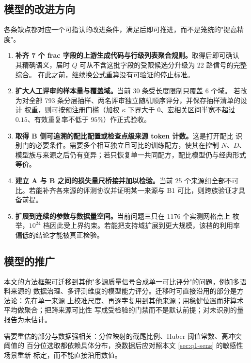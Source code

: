 \documentclass[bwprint]{gmcmthesis}
\numberwithin{equation}{section}
\numberwithin{figure}{section}
\numberwithin{table}{section}
\begin{document}
\subsection{模型的改进方向}

各条缺点都对应一个可指认的改进条件，满足后即可推进，而不是笼统的"提高精度"。

\begin{enumerate}
\item \textbf{补齐 7 个 frac 字段的上游生成代码与行级列表聚合规则。}取得后即可确认
      其精确语义，届时 $Q$ 可从不含这批字段的受限候选分升级为 22 路信号的完整综合。
      在此之前，继续换公式重算没有可验证的停止标准。
\item \textbf{扩大人工评审的样本量与覆盖域。}当前 30 条受长度限制只覆盖 6 个域。
      若改为对全部 793 条分层抽样、两名评审独立随机顺序评分，并保存抽样清单的设计
      权重，则可按预注册门槛（加权 $\kappa$ 下界大于 0、宏相关区间半宽不超过
      $0.15$、有效重复率不低于 $95\%$）作正式验收。
\item \textbf{取得 B 侧可追溯的配比配置或检查点级来源 token 计数。}这是打开配比
      识别门的必要条件。需要多个相互独立且可比的训练配方，使其在控制 $N$、$D$、
      模型族与来源之后仍有变异；若只恢复单一共同配方，配比模型仍与经典形式等价。
\item \textbf{建立 A 与 B 之间的损失量尺桥接并加以检验。}当前 25 个来源组全部不可
      比。若能补齐各来源的评测协议并证明某一来源与 B1 可比，则跨族验证才具备前提。
\item \textbf{扩展到连续的参数与数据量空间。}当前问题三只在 1176 个实测网格点上
      枚举，$10^{24}$ 档因此受上界约束。若能把支持域扩展到更大规模，该档的利用率
      偏低的结论才能被真正检验。
\end{enumerate}

\subsection{模型的推广}

本文的方法框架可迁移到其他"多源质量信号合成单一可比评分"的问题，例如多语料来源的
数据治理、多评测维度的模型能力评分。迁移时可直接沿用的部分是方法论：先在单一来源
上校准尺度、再逐字复用到其他来源；用稳健位置而非算术平均做聚合；把跨来源可比性
写成受检验的门禁而不是默认前提；对未识别的量报告为未估计。

需要重估的部分与数据强相关：分位映射的截尾比例、Huber 阈值常数、高冲突阈值的
百分位选取都依赖具体分布，换数据后应对照本文 \ref{sec:q1-sens} 的敏感性场景重新
标定，而不能直接沿用数值。
\end{document}
